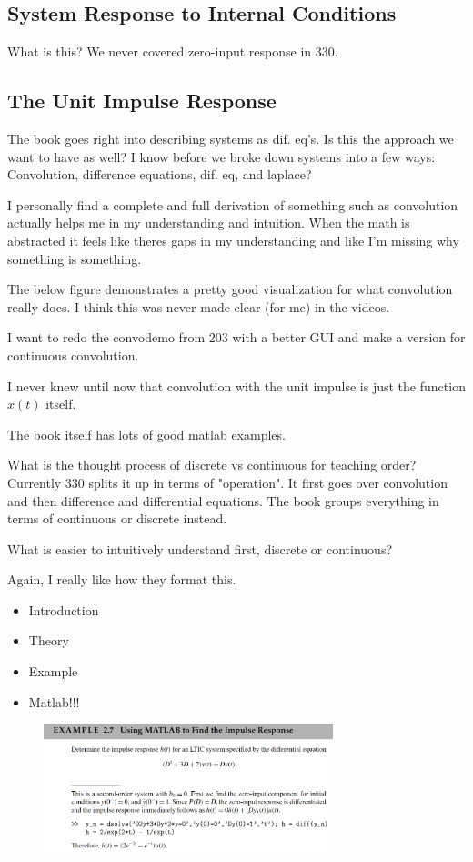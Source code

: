 \subsection{System Response to Internal Conditions}
What is this? We never covered zero-input response in 330.

\subsection{The Unit Impulse Response}
The book goes right into describing systems as dif. eq's. Is this the approach we want to have as well? I know before we broke down systems into a few ways: Convolution, difference equations, dif. eq, and laplace?

I personally find a complete and full derivation of something such as convolution actually helps me in my understanding and intuition. When the math is abstracted it feels like theres gaps in my understanding and like I'm missing why something is something.

The below figure demonstrates a pretty good visualization for what convolution really does. I think this was never made clear (for me) in the videos.

I want to redo the convodemo from 203 with a better GUI and make a version for continuous convolution.

I never knew until now that convolution with the unit impulse is just the function $x(t)$ itself.

The book itself has lots of good matlab examples.

What is the thought process of discrete vs continuous for teaching order? Currently 330 splits it up in terms of "operation". It first goes over convolution and then difference and differential equations. The book groups everything in terms of continuous or discrete instead.

What is easier to intuitively understand first, discrete or continuous?

Again, I really like how they format this.
\begin{itemize}
    \item Introduction
    \item Theory
    \item Example
    \item Matlab!!!
\end{itemize}

\begin{figure}
    \center \includegraphics[width = 0.75\textwidth]{images/example 2.7.png}
\end{figure}

